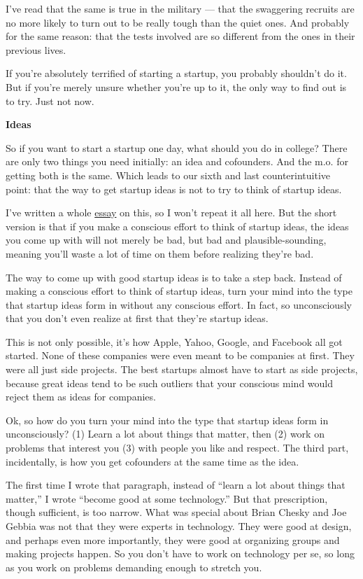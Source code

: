 \documentclass[12pt]{book}
\begin{document}
I've read that the same is true in the military --- that the swaggering
recruits are no more likely to turn out to be really tough than the
quiet ones. And probably for the same reason: that the tests involved
are so different from the ones in their previous lives.

If you're absolutely terrified of starting a startup, you probably
shouldn't do it. But if you're merely unsure whether you're up to it,
the only way to find out is to try. Just not now.

\textbf{Ideas}

So if you want to start a startup one day, what should you do in
college? There are only two things you need initially: an idea and
cofounders. And the m.o. for getting both is the same. Which leads to
our sixth and last counterintuitive point: that the way to get startup
ideas is not to try to think of startup ideas.

I've written a whole \href{startupideas.html}{essay} on this, so I won't
repeat it all here. But the short version is that if you make a
conscious effort to think of startup ideas, the ideas you come up with
will not merely be bad, but bad and plausible-sounding, meaning you'll
waste a lot of time on them before realizing they're bad.

The way to come up with good startup ideas is to take a step back.
Instead of making a conscious effort to think of startup ideas, turn
your mind into the type that startup ideas form in without any conscious
effort. In fact, so unconsciously that you don't even realize at first
that they're startup ideas.

This is not only possible, it's how Apple, Yahoo, Google, and Facebook
all got started. None of these companies were even meant to be companies
at first. They were all just side projects. The best startups almost
have to start as side projects, because great ideas tend to be such
outliers that your conscious mind would reject them as ideas for
companies.

Ok, so how do you turn your mind into the type that startup ideas form
in unconsciously? (1) Learn a lot about things that matter, then (2)
work on problems that interest you (3) with people you like and respect.
The third part, incidentally, is how you get cofounders at the same time
as the idea.

The first time I wrote that paragraph, instead of ``learn a lot about
things that matter,'' I wrote ``become good at some technology.'' But
that prescription, though sufficient, is too narrow. What was special
about Brian Chesky and Joe Gebbia was not that they were experts in
technology. They were good at design, and perhaps even more importantly,
they were good at organizing groups and making projects happen. So you
don't have to work on technology per se, so long as you work on problems
demanding enough to stretch you.
\end{document}

